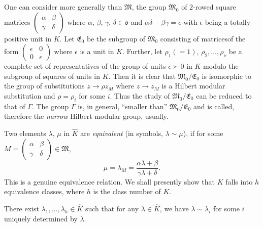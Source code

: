 One can consider more generally than $\mathfrak{M}$, the group
$\mathfrak{M}_{0}$ of $2$-rowed square matrices
$\left(\begin{smallmatrix} \alpha & \beta\\ \gamma & \delta
\end{smallmatrix}\right)$ where $\alpha$, $\beta$, $\gamma$,
$\delta\in\mathfrak{o}$ and $\alpha\delta-\beta\gamma=\epsilon$ with
$\epsilon$ being a totally positive unit in $K$. Let
$\mathfrak{E}_{0}$ be the subgroup of $\mathfrak{M}_{0}$ consisting of
matrices\pageoriginale of the form $\left(\begin{smallmatrix} \epsilon
  & 0\\ 0 & \epsilon\end{smallmatrix}\right)$ where $\epsilon$ is a
  unit in $K$. Further, let $\rho_{1}(=1)$,
  $\rho_{2},\ldots,\rho_{\nu}$ be a complete set of representatives of
  the group of units $\epsilon \succ 0$ in $K$ modulo the subgroup of
  squares of units in $K$. Then it is clear that
  $\mathfrak{M}_{0}/\mathfrak{E}_{0}$ is isomorphic to the group of
  substitutions $z\to \rho z_{M}$ where $z\to z_{M}$ is a Hilbert
  modular substitution and $\rho=\rho_{i}$ for some $i$. Thus the
  study of $\mathfrak{M}_{0}/\mathfrak{E}_{0}$ can be reduced to that
  of $\Gamma$. The group $\Gamma$ is, in general, ``smaller than''
  $\mathfrak{M}_{0}/\mathfrak{E}_{0}$ and is called, therefore the
  {\em narrow} Hilbert modular group, usually.

Two elements $\lambda$, $\mu$ in $\hat{K}$ are {\em equivalent}
(in symbols, $\lambda\sim \mu$), if for some
$M=\left(\begin{smallmatrix} \alpha & \beta\\ \gamma & \delta
\end{smallmatrix}\right)\in\mathfrak{M}$, 
$$
\mu=\lambda_{M}=\frac{\alpha\lambda+\beta}{\gamma\lambda+\delta}.
$$
This is a genuine equivalence relation. We shall presently show that
$K$ falls into $h$ equivalence classes, where $h$ is the class number
of $K$.

\begin{proposition}\label{prop20}
There exist $\lambda_{1},\ldots,\lambda_{h}\in \hat{K}$ such that
for any $\lambda\in \hat{K}$, we have $\lambda\sim\lambda_{i}$ for
some $i$ uniquely determined by $\lambda$.
\end{proposition}

